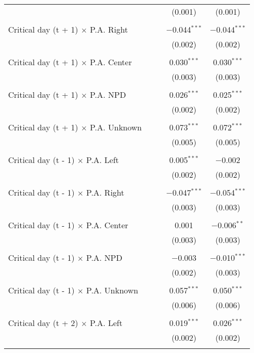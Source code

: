 \documentclass[
]{article}
\begin{document}
\begin{table}[!htbp]
{\begin{tabular}{@{\extracolsep{5pt}}lcccc}
  &  &  & (0.001) & (0.001) \\ 
  & & & & \\ 
 Critical day (t + 1) $\times$ P.A. Right &  &  & $-$0.044$^{***}$ & $-$0.044$^{***}$ \\ 
  &  &  & (0.002) & (0.002) \\ 
  & & & & \\ 
 Critical day (t + 1) $\times$ P.A. Center &  &  & 0.030$^{***}$ & 0.030$^{***}$ \\ 
  &  &  & (0.003) & (0.003) \\ 
  & & & & \\ 
 Critical day (t + 1) $\times$ P.A. NPD &  &  & 0.026$^{***}$ & 0.025$^{***}$ \\ 
  &  &  & (0.002) & (0.002) \\ 
  & & & & \\ 
 Critical day (t + 1) $\times$ P.A. Unknown &  &  & 0.073$^{***}$ & 0.072$^{***}$ \\ 
  &  &  & (0.005) & (0.005) \\ 
  & & & & \\ 
 Critical day (t - 1) $\times$ P.A. Left &  &  & 0.005$^{***}$ & $-$0.002 \\ 
  &  &  & (0.002) & (0.002) \\ 
  & & & & \\ 
 Critical day (t - 1) $\times$ P.A. Right &  &  & $-$0.047$^{***}$ & $-$0.054$^{***}$ \\ 
  &  &  & (0.003) & (0.003) \\ 
  & & & & \\ 
 Critical day (t - 1) $\times$ P.A. Center &  &  & 0.001 & $-$0.006$^{**}$ \\ 
  &  &  & (0.003) & (0.003) \\ 
  & & & & \\ 
 Critical day (t - 1) $\times$ P.A. NPD &  &  & $-$0.003 & $-$0.010$^{***}$ \\ 
  &  &  & (0.002) & (0.003) \\ 
  & & & & \\ 
 Critical day (t - 1) $\times$ P.A. Unknown &  &  & 0.057$^{***}$ & 0.050$^{***}$ \\ 
  &  &  & (0.006) & (0.006) \\ 
  & & & & \\ 
 Critical day (t + 2) $\times$ P.A. Left &  &  & 0.019$^{***}$ & 0.026$^{***}$ \\ 
  &  &  & (0.002) & (0.002) \\ 
  & & & & \\ 

\end{tabular}}
\end{table}
\end{document}
